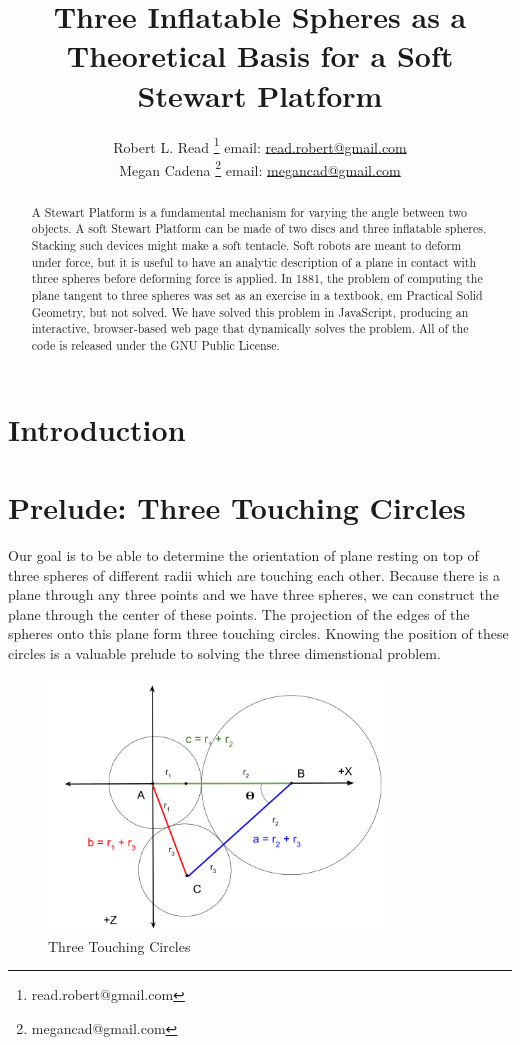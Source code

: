 \documentclass{article}
\title{Three Inflatable Spheres as a Theoretical Basis for a Soft Stewart Platform}
\author{Robert L. Read
  \thanks{read.robert@gmail.com}
  email: \href{mailto:read.robert@gmail.com}{read.robert@gmail.com}\\
Megan Cadena
  \thanks{megancad@gmail.com}
  email: \href{mailto:megancad@gmail.com}{megancad@gmail.com}
  }
\begin{document}
\maketitle
\begin{abstract}
  A Stewart Platform\cite{wiki:stewart} is a fundamental mechanism for varying the angle
  between two objects.
  A soft Stewart Platform can be made of two discs and
  three inflatable spheres.
  Stacking such devices might make a soft tentacle.
  Soft robots are meant to deform under force, but it is useful to have
  an analytic description of a plane in contact with three spheres
  before deforming force is applied.
  In 1881, the problem of computing the plane tangent to three spheres was
  set as an exercise in a textbook, {em Practical Solid Geometry}\cite{payne1881},
  but not solved.
  We have solved this problem in JavaScript, producing an interactive,
  browser-based web page that dynamically solves the problem\cite{softrobotcalc}.
  All of the code is released under the GNU Public License.
\end{abstract}


\section{Introduction}


\section{Prelude: Three Touching Circles}

Our goal is to be able to determine the orientation of plane resting
on top of three spheres of different radii which are touching each
other.
Because there is a plane through any three points and we have three spheres, we can construct the plane through
the center of these points.
The projection of the edges of the spheres onto this plane form three touching circles.
Knowing the position of these circles is a valuable prelude to solving the three dimenstional problem.

\begin{figure}
     \centering
     \includegraphics[width=0.8\textwidth]{figures/ThreeTouchingCircles.png}
     \caption{Three Touching Circles}
  \label{fig:Tangent}
\end{figure}
\end{document}
